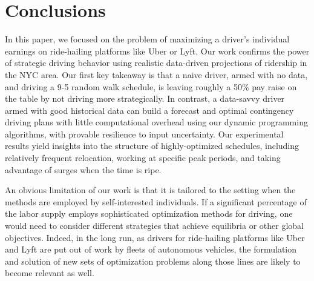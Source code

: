 
\section{Conclusions}
\label{sec:conclusions}
In this paper, we focused on the problem of 
maximizing a driver's individual earnings on ride-hailing platforms like Uber or Lyft.
Our work confirms the power of strategic driving behavior %
using realistic data-driven projections
of ridership in the NYC area.  Our first key takeaway is that a naive driver,
armed with no data, and driving a 9-5 random walk schedule, is leaving 
roughly a 50\% pay raise on the table by not driving more strategically. 
In contrast, a data-savvy driver armed with
good historical data can build a forecast and optimal contingency driving plans 
with little computational overhead using 
our dynamic programming algorithms, with provable resilience to input
uncertainty.  Our experimental results yield insights into the
structure of highly-optimized schedules, including relatively frequent relocation,
working at specific peak periods, and taking advantage of 
surges when the time is ripe.  

An obvious limitation of our work is that it is tailored to the setting when the 
methods are employed by self-interested individuals.  If a 
significant percentage of the labor supply employs sophisticated optimization methods
for driving, one would need to consider different strategies that achieve equilibria
or other global objectives. %
Indeed, in the long run, as drivers for ride-hailing 
platforms like Uber and Lyft are put out of work by fleets of autonomous vehicles, 
the formulation and solution of new sets of optimization problems along those lines
are likely to become relevant as well.



